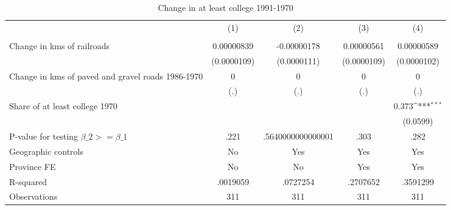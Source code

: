 \begin{table}[htbp]\centering
\def\sym#1{\ifmmode^{#1}\else\(^{#1}\)\fi}
\caption{Change in at least college 1991-1970}
\begin{tabular}{l*{4}{c}}
\hline\hline
                &\multicolumn{1}{c}{(1)}&\multicolumn{1}{c}{(2)}&\multicolumn{1}{c}{(3)}&\multicolumn{1}{c}{(4)}\\
                &\multicolumn{1}{c}{}&\multicolumn{1}{c}{}&\multicolumn{1}{c}{}&\multicolumn{1}{c}{}\\
\hline
Change in kms of railroads&0.00000839         &-0.00000178         &0.00000561         &0.00000589         \\
                &(0.0000109)         &(0.0000111)         &(0.0000109)         &(0.0000102)         \\
[1em]
Change in kms of paved and gravel roads 1986-1970&        0         &        0         &        0         &        0         \\
                &      (.)         &      (.)         &      (.)         &      (.)         \\
[1em]
Share of at least college 1970&                  &                  &                  &    0.373\sym{***}\\
                &                  &                  &                  & (0.0599)         \\
\hline
P-value for testing $\beta\_{2} >= \beta\_{1}$&     .221         &.5640000000000001         &     .303         &     .282         \\
Geographic controls&       No         &      Yes         &      Yes         &      Yes         \\
Province FE     &       No         &       No         &      Yes         &      Yes         \\
R-squared       & .0019059         & .0727254         & .2707652         & .3591299         \\
Observations    &      311         &      311         &      311         &      311         \\
\hline\hline
\end{tabular}
\end{table}
